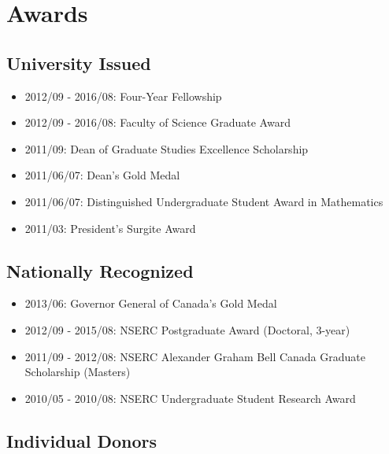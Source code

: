 \documentclass[]{book}
\providecommand{\tightlist}{%
  \setlength{\itemsep}{0pt}\setlength{\parskip}{0pt}}
\begin{document}
\hypertarget{awards}{%
\section{Awards}\label{awards}}

\hypertarget{university-issued}{%
\subsection{University Issued}\label{university-issued}}

\begin{itemize}
\tightlist
\item
  2012/09 - 2016/08: Four-Year Fellowship
\item
  2012/09 - 2016/08: Faculty of Science Graduate Award
\item
  2011/09: Dean of Graduate Studies Excellence Scholarship
\item
  2011/06/07: Dean's Gold Medal
\item
  2011/06/07: Distinguished Undergraduate Student Award in Mathematics
\item
  2011/03: President's Surgite Award
\end{itemize}

\hypertarget{nationally-recognized}{%
\subsection{Nationally Recognized}\label{nationally-recognized}}

\begin{itemize}
\tightlist
\item
  2013/06: Governor General of Canada's Gold Medal
\item
  2012/09 - 2015/08: NSERC Postgraduate Award (Doctoral, 3-year)
\item
  2011/09 - 2012/08: NSERC Alexander Graham Bell Canada Graduate Scholarship (Masters)
\item
  2010/05 - 2010/08: NSERC Undergraduate Student Research Award
\end{itemize}

\hypertarget{individual-donors}{%
\subsection{Individual Donors}\label{individual-donors}}
\end{document}
